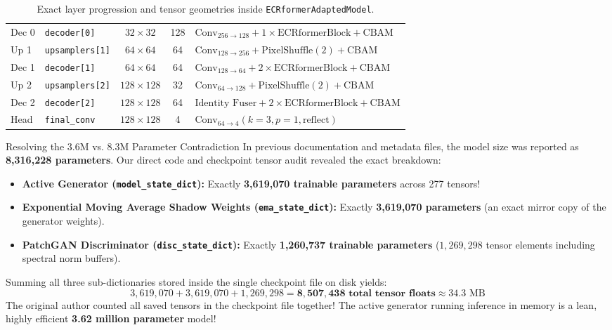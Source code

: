 \begin{table}[htbp]
\begin{tabularx}{\textwidth}{llccX}
Dec 0 & \texttt{decoder[0]} & $32 \times 32$ & 128 & $\text{Conv}_{256\to 128} + 1\times \text{ECRformerBlock} + \text{CBAM}$ \\
Up 1 & \texttt{upsamplers[1]} & $64 \times 64$ & 64 & $\text{Conv}_{128\to 256} + \text{PixelShuffle}(2) + \text{CBAM}$ \\
Dec 1 & \texttt{decoder[1]} & $64 \times 64$ & 64 & $\text{Conv}_{128\to 64} + 2\times \text{ECRformerBlock} + \text{CBAM}$ \\
Up 2 & \texttt{upsamplers[2]} & $128 \times 128$ & 32 & $\text{Conv}_{64\to 128} + \text{PixelShuffle}(2) + \text{CBAM}$ \\
Dec 2 & \texttt{decoder[2]} & $128 \times 128$ & 64 & $\text{Identity Fuser} + 2\times \text{ECRformerBlock} + \text{CBAM}$ \\
Head & \texttt{final\_conv} & $128 \times 128$ & 4 & $\text{Conv}_{64\to 4}(k=3, p=1, \text{reflect})$ \\
\bottomrule
\end{tabularx}
\caption{Exact layer progression and tensor geometries inside \texttt{ECRformerAdaptedModel}.}
\label{tab:unet_layers}
\end{table}

\begin{researchbox}{Resolving the 3.6M vs. 8.3M Parameter Contradiction}
In previous documentation and metadata files, the model size was reported as \textbf{8,316,228 parameters}. Our direct code and checkpoint tensor audit revealed the exact breakdown:
\begin{itemize}
    \item \textbf{Active Generator (\texttt{model\_state\_dict}):} Exactly \textbf{3,619,070 trainable parameters} across 277 tensors!
    \item \textbf{Exponential Moving Average Shadow Weights (\texttt{ema\_state\_dict}):} Exactly \textbf{3,619,070 parameters} (an exact mirror copy of the generator weights).
    \item \textbf{PatchGAN Discriminator (\texttt{disc\_state\_dict}):} Exactly \textbf{1,260,737 trainable parameters} ($1{,}269{,}298$ tensor elements including spectral norm buffers).
\end{itemize}
Summing all three sub-dictionaries stored inside the single checkpoint file on disk yields:
\[
3{,}619{,}070 + 3{,}619{,}070 + 1{,}269{,}298 = \mathbf{8{,}507{,}438\text{ total tensor floats}} \approx 34.3\text{ MB}
\]
The original author counted all saved tensors in the checkpoint file together! The active generator running inference in memory is a lean, highly efficient \textbf{3.62 million parameter} model!
\end{researchbox}

